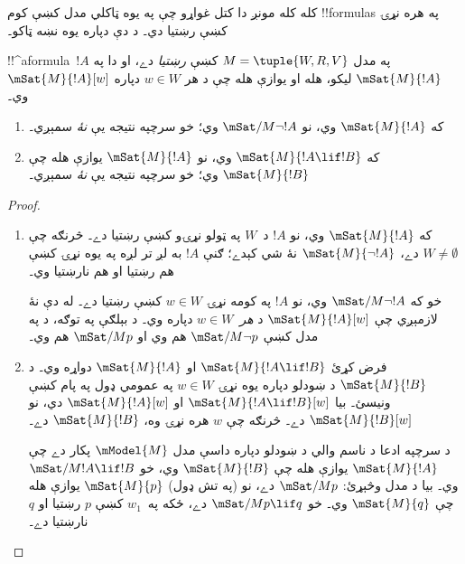 \documentclass[../../../include/open-logic-section]{subfiles}
\begin{document}


کله کله مونږ دا کتل غواړو چې په يوه ټاکلي مدل کښې کوم !!{formula}s
په هره نړۍ کښې رښتيا دي۔ د دې دپاره يوه نښه ټاکو۔

\begin{defn}
  !!^a{formula}~$!A$ په مدل $M = \tuple{W, R,
    V}$ کښې \emph{رښتيا} دے، او دا په $\mSat{M}{!A}$ ليکو، هله او
  يوازې هله چې د هر $w \in W$ دپاره $\mSat{M}{!A}[w]$ وي۔
\end{defn}

\begin{prop}
  \begin{enumerate}
  \item که $\mSat{M}{!A}$ وي، نو $\mSat/{M}{\lnot !A}$ وي؛ خو سرچپه
    نتيجه يې \emph{نۀ} سمېږي۔
  \item که $\mSat{M}{!A \lif !B}$ وي، نو $\mSat{M}{!A}$ يوازې هله
    چې $\mSat{M}{!B}$ وي؛ خو سرچپه نتيجه يې \emph{نۀ} سمېږي۔
  \end{enumerate}
\end{prop}

\begin{proof}
  \begin{enumerate}
  \item که $\mSat{M}{!A}$ وي، نو $!A$ د~$W$ په ټولو نړۍو کښې رښتيا
    دے۔ څرنګه چې $W \neq \emptyset$ دے، $\mSat{M}{\lnot!A}$ نۀ شي
    کېدے؛ ګنې $!A$ به لږ تر لږه په يوه نړۍ کښې هم رښتيا او هم نارښتيا
    وي۔

    خو که $\mSat/{M}{\lnot !A}$ وي، نو $!A$ په کومه نړۍ $w \in W$
    کښې رښتيا دے۔ له دې نۀ لازمېږي چې $\mSat{M}{!A}[w]$ د
    \emph{هر}~$w \in W$ دپاره وي۔ د بېلګې په توګه، د
     په مدل کښې $\mSat/{M}{\lnot p}$ هم وي او
    $\mSat/{M}{p}$ هم وي۔
  \item فرض کړئ $\mSat{M}{!A \lif !B}$ او $\mSat{M}{!A}$ دواړه وي۔
    د $\mSat{M}{!B}$ د ښودلو دپاره يوه نړۍ $w \in W$ په عمومي ډول په پام کښې ونيسئ۔ بيا
    $\mSat{M}{!A \lif !B}[w]$ او $\mSat{M}{!A}[w]$ دي، نو
    $\mSat{M}{!B}[w]$ دے۔ څرنګه چې $w$ هره نړۍ وه، $\mSat{M}{!B}$
    دے۔

    د سرچپه ادعا د ناسم والي د ښودلو دپاره داسې مدل $\mModel{M}$
    پکار دے چې $\mSat{M}{!A}$ يوازې هله چې $\mSat{M}{!B}$ وي، خو
    $\mSat/{M}{!A \lif !B}$ وي۔ بيا د  مدل
    وڅېړئ: $\mSat/{M}{p}$ دے، نو (په تش ډول) $\mSat{M}{p}$ يوازې
    هله چې $\mSat{M}{q}$ وي۔ خو $\mSat/{M}{p \lif
      q}$ دے، ځکه په~$w_1$ کښې $p$ رښتيا او $q$ نارښتيا دے۔
  \end{enumerate}
\end{proof}
\end{document}
